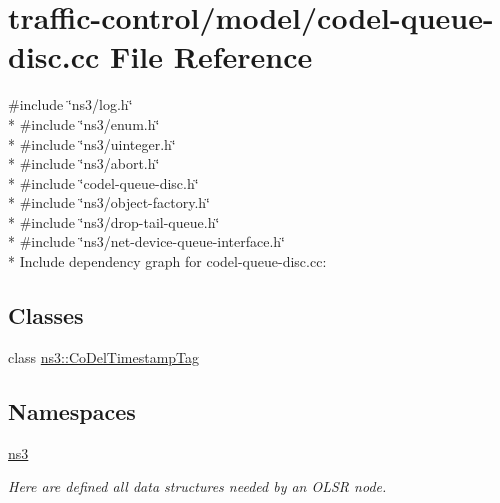 \hypertarget{codel-queue-disc_8cc}{}\section{traffic-\/control/model/codel-\/queue-\/disc.cc File Reference}
\label{codel-queue-disc_8cc}
{\ttfamily \#include \char`\"{}ns3/log.\+h\char`\"{}}\\*
{\ttfamily \#include \char`\"{}ns3/enum.\+h\char`\"{}}\\*
{\ttfamily \#include \char`\"{}ns3/uinteger.\+h\char`\"{}}\\*
{\ttfamily \#include \char`\"{}ns3/abort.\+h\char`\"{}}\\*
{\ttfamily \#include \char`\"{}codel-\/queue-\/disc.\+h\char`\"{}}\\*
{\ttfamily \#include \char`\"{}ns3/object-\/factory.\+h\char`\"{}}\\*
{\ttfamily \#include \char`\"{}ns3/drop-\/tail-\/queue.\+h\char`\"{}}\\*
{\ttfamily \#include \char`\"{}ns3/net-\/device-\/queue-\/interface.\+h\char`\"{}}\\*
Include dependency graph for codel-\/queue-\/disc.cc\+:
\subsection*{Classes}
\begin{DoxyCompactItemize}
\item 
class \hyperlink{classns3_1_1CoDelTimestampTag}{ns3\+::\+Co\+Del\+Timestamp\+Tag}
\end{DoxyCompactItemize}
\subsection*{Namespaces}
\begin{DoxyCompactItemize}
\item 
 \hyperlink{namespacens3}{ns3}
\begin{DoxyCompactList}\small\item\em Here are defined all data structures needed by an O\+L\+SR node. \end{DoxyCompactList}\end{DoxyCompactItemize}
